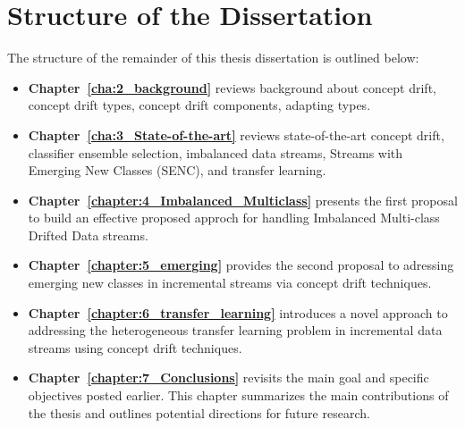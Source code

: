 
\section{Structure of the Dissertation}
\label{sec:1_introduction_organizations}
The structure of the remainder of this thesis dissertation is outlined below:
\begin{itemize}	
	\setlength{\itemsep}{2pt}
    \setlength{\parskip}{2pt}
	\item \textbf{Chapter~\ref{cha:2_background}} reviews background about concept drift, concept drift types, concept drift components, adapting types.  
	\item \textbf{Chapter~\ref{cha:3_State-of-the-art}} reviews state-of-the-art  concept drift, classifier ensemble selection, imbalanced data streams, Streams with Emerging New Classes (SENC), and transfer learning.  
	\item \textbf{Chapter~\ref{chapter:4_Imbalanced_Multiclass}
	} presents the first proposal to build an effective proposed approch for  handling Imbalanced Multi-class Drifted Data streams.
	\item \textbf{Chapter~\ref{chapter:5_emerging}} provides the second proposal to adressing emerging new classes in incremental streams via concept drift techniques. 
	\item \textbf{Chapter~\ref{chapter:6_transfer_learning}} introduces a novel approach to addressing the heterogeneous transfer learning problem in incremental data streams using concept drift techniques.
	
	\item \textbf{Chapter~\ref{chapter:7_Conclusions}} revisits the main goal and specific objectives posted earlier. This chapter summarizes the main contributions of the thesis and outlines potential directions for future research.

\end{itemize}